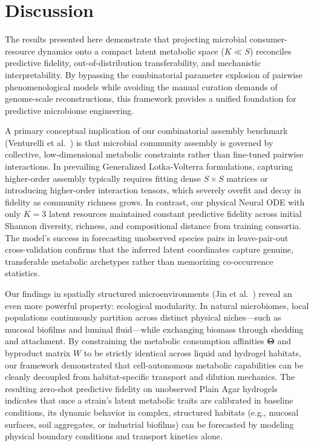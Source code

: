 \section{Discussion}
\label{sec:discussion}

The results presented here demonstrate that projecting microbial consumer-resource dynamics onto a compact latent metabolic space ($K \ll S$) reconciles predictive fidelity, out-of-distribution transferability, and mechanistic interpretability. By bypassing the combinatorial parameter explosion of pairwise phenomenological models while avoiding the manual curation demands of genome-scale reconstructions, this framework provides a unified foundation for predictive microbiome engineering.

A primary conceptual implication of our combinatorial assembly benchmark (Venturelli et al.~\cite{venturelli2018deciphering}) is that microbial community assembly is governed by collective, low-dimensional metabolic constraints rather than fine-tuned pairwise interactions. In prevailing Generalized Lotka-Volterra formulations, capturing higher-order assembly typically requires fitting dense $S \times S$ matrices or introducing higher-order interaction tensors, which severely overfit and decay in fidelity as community richness grows. In contrast, our physical Neural ODE with only $K=3$ latent resources maintained constant predictive fidelity across initial Shannon diversity, richness, and compositional distance from training consortia. The model's success in forecasting unobserved species pairs in leave-pair-out cross-validation confirms that the inferred latent coordinates capture genuine, transferable metabolic archetypes rather than memorizing co-occurrence statistics.

Our findings in spatially structured microenvironments (Jin et al.~\cite{jin2023culturing}) reveal an even more powerful property: ecological modularity. In natural microbiomes, local populations continuously partition across distinct physical niches---such as mucosal biofilms and luminal fluid---while exchanging biomass through shedding and attachment. By constraining the metabolic consumption affinities $\mathbf{\Theta}$ and byproduct matrix $W$ to be strictly identical across liquid and hydrogel habitats, our framework demonstrated that cell-autonomous metabolic capabilities can be cleanly decoupled from habitat-specific transport and dilution mechanics. The resulting zero-shot predictive fidelity on unobserved Plain Agar hydrogels indicates that once a strain's latent metabolic traits are calibrated in baseline conditions, its dynamic behavior in complex, structured habitats (e.g., mucosal surfaces, soil aggregates, or industrial biofilms) can be forecasted by modeling physical boundary conditions and transport kinetics alone.

